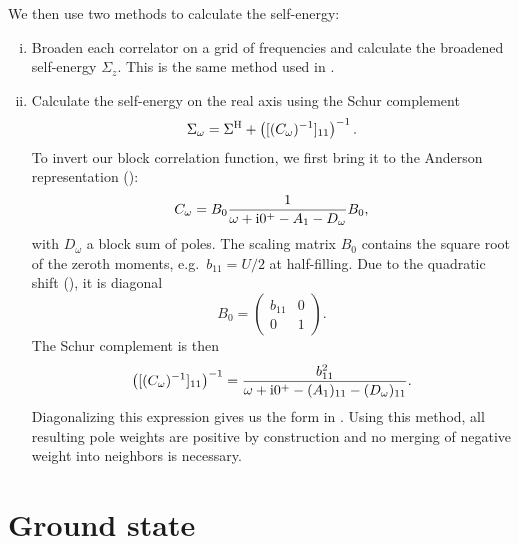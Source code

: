 We then use two methods to calculate the self-energy:
\begin{enumerate}[(i)]
    \item Broaden each correlator on a grid of frequencies
          and calculate the broadened self-energy $\Sigma_z$.
          This is the same method used in \cite{Kugler2022}.

    \item Calculate the self-energy on the real axis using the Schur complement \cite{Schur1917}
          \begin{equation}
              \Sigma_\omega = \Sigma^{\mathrm{H}} + \left([(C_\omega)^{-1}]_{11}\right)^{-1}.
          \end{equation}
          To invert our block correlation function, we first bring it to
          the Anderson representation ():
          \begin{equation}
              C_\omega = B_0\frac{1}{\omega + \mathrm{i}0^+ - A_1 - D_\omega}B_0,
          \end{equation}
          with $D_\omega$ a block sum of poles.
          The scaling matrix $B_0$ contains the square root of the zeroth moments,
          e.g.\ $b_{11} = U/2$ at half-filling.
          Due to the quadratic shift (), it is diagonal
          \begin{equation}
              B_0
              =
              \begin{pmatrix}
                  b_{11} & 0 \\
                  0      & 1
              \end{pmatrix}.
          \end{equation}
          The Schur complement is then
          \begin{equation}
              \left([(C_\omega)^{-1}]_{11}\right)^{-1}
              =
              \frac{b_{11}^2}{\omega + \mathrm{i}0^+ - (A_1)_{11} - (D_\omega)_{11}}.
          \end{equation}
          Diagonalizing this expression gives us the form in .
          Using this method, all resulting pole weights are positive by construction
          and no merging of negative weight into neighbors is necessary.
\end{enumerate}

\section{Ground state}

